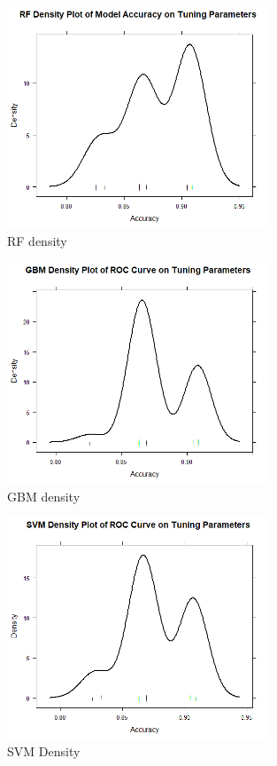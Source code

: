\begin{figure}[H]
\centering     
\includegraphics[width=0.7\textwidth]{Figures/results/rf_density.png}
\caption{RF density}
\label{fig:Dendrogram}
\end{figure} 

\begin{figure}[H]
\centering     
\includegraphics[width=0.7\textwidth]{Figures/results/gbm_density.png}
\caption{GBM density}
\label{fig:Dendrogram}
\end{figure} 

\begin{figure}[H]
\centering     
\includegraphics[width=0.7\textwidth]{Figures/results/svm_density.png}
\caption{SVM Density}
\label{fig:Dendrogram}
\end{figure} 

